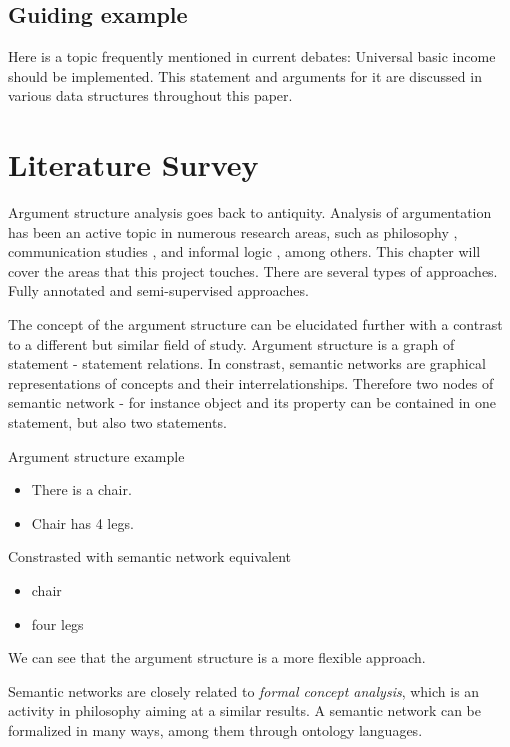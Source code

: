 \documentclass{report}
\begin{document}
\section{Guiding example}

Here is a topic frequently mentioned in current debates: Universal basic income should be implemented.
This statement and arguments for it are discussed in various data structures throughout this paper.

\chapter{Literature Survey}
Argument structure analysis goes back to antiquity. \cite{angelelli_techniques_1970}
Analysis of argumentation has been an active topic in numerous research areas, such as philosophy \cite{van_eemeren_systematic_2003}, communication studies \cite{mercier_why_2011}, and informal logic \cite{blair_informal_2000}, among others. This chapter will cover the areas that this project touches. There are several types of approaches. Fully annotated and semi-supervised approaches.

The concept of the argument structure can be elucidated further with a contrast to a different but similar field of study.
Argument structure is a graph of statement - statement relations.
In constrast, semantic networks \cite{noauthor_semantic_2023} are graphical representations of concepts and their interrelationships. Therefore two nodes of semantic network - for instance object and its property can be contained in one statement, but also two statements.

Argument structure example
\begin{itemize}
  \item There is a chair.
  \item Chair has 4 legs.
\end{itemize}

Constrasted with semantic network equivalent
\begin{itemize}
  \item chair
  \item four legs
\end{itemize}
We can see that the argument structure is a more flexible approach.

Semantic networks are closely related to \textit{formal concept analysis}, which is an activity in philosophy aiming at a similar results. A semantic network can be formalized in many ways, among them through ontology languages.
\end{document}
